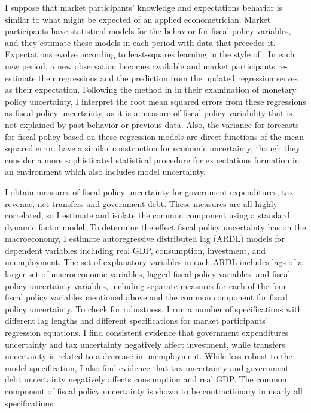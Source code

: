 \documentclass[11pt]{article}
\newcommand{\citee}[1]{\citet{#1}}
\begin{document}
I suppose that market participants' knowledge and expectations behavior is similar to what might be expected of an applied econometrician.  Market participants have statistical models for the behavior for fiscal policy variables, and they estimate these models in each period with data that precedes it.  Expectations evolve according to least-squares learning in the style of \citee{eh2001}.  In each new period, a new observation becomes available and market participants re-estimate their regressions and the prediction from the updated regression serves as their expectation.  Following the method in \citee{herromurray} in their examination of monetary policy uncertainty, I interpret the root mean squared errors from these regressions as fiscal policy uncertainty, as it is a measure of fiscal policy variability that is not explained by past behavior or previous data.  Also, the variance for forecasts for fiscal policy based on these regression models are direct functions of the mean squared error.  \citee{orlik2013} have a similar construction for economic uncertainty, though they consider a more sophisticated statistical procedure for expectations formation in an environment which also includes model uncertainty.  

I obtain measures of fiscal policy uncertainty for government expenditures, tax revenue, net transfers and government debt.  These measures are all highly correlated, so I estimate and isolate the common component using a standard dynamic factor model.  To determine the effect fiscal policy uncertainty has on the macroeconomy, I estimate autoregressive distributed lag (ARDL) models for dependent variables including real GDP, consumption, investment, and unemployment.  The set of explanatory variables in each ARDL includes lags of a larger set of macroeconomic variables, lagged fiscal policy variables, and fiscal policy uncertainty variables, including separate measures for each of the four fiscal policy variables mentioned above and the common component for fiscal policy uncertainty.  To check for robustness, I run a number of specifications with different lag lengths and different specifications for market participants' regression equations.  I find consistent evidence that government expenditures uncertainty and tax uncertainty negatively affect investment, while transfers uncertainty is related to a decrease in unemployment.  While less robust to the model specification, I also find evidence that tax uncertainty and government debt uncertainty negatively affects consumption and real GDP.  The common component of fiscal policy uncertainty is shown to be contractionary in nearly all specifications.
\end{document}
